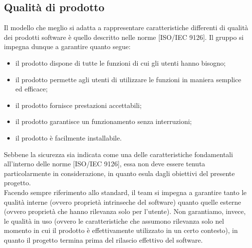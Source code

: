 	\subsection{Qualità di prodotto}
		Il modello che meglio si adatta a rappresentare caratteristiche differenti di qualità dei prodotti software è quello descritto nelle norme [ISO/IEC 9126]. Il gruppo \groupname{} si impegna dunque a garantire quanto segue:
		\begin{itemize}
			\item il prodotto dispone di tutte le funzioni di cui gli utenti hanno bisogno;
			\item il prodotto permette agli utenti di utilizzare le funzioni in maniera semplice ed efficace;
			\item il prodotto fornisce prestazioni accettabili;
			\item il prodotto garantisce un funzionamento senza interruzioni;
			\item il prodotto è facilmente installabile.
		\end{itemize}
		Sebbene la sicurezza sia indicata come una delle caratteristiche fondamentali all'interno delle norme [ISO/IEC 9126], essa non deve essere tenuta particolarmente in considerazione, in quanto esula dagli obiettivi del presente progetto.\\
		Facendo sempre riferimento allo standard, il team si impegna a garantire tanto le qualità interne (ovvero proprietà intrinseche del software) quanto quelle esterne (ovvero proprietà che hanno rilevanza solo per l'utente). Non garantiamo, invece, le qualità in uso (ovvero le caratteristiche che assumono rilevanza solo nel momento in cui il prodotto è effettivamente utilizzato in un certo contesto), in quanto il progetto termina prima del rilascio effettivo del software.
